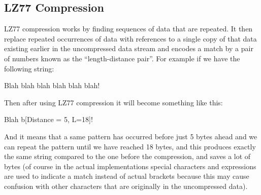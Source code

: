 \documentclass[12pt]{article}
\begin{document}
    \subsection{LZ77 Compression}
    LZ77 compression works by finding sequences of data that are repeated. It then replace repeated occurrences of data with references to a single copy of that data existing earlier in the uncompressed data stream and encodes a match by a pair of numbers known as the ``length-distance pair''. For example if we have the following string:\\
    \begin{center} Blah blah blah blah blah blah! \end{center}
    Then after using LZ77 compression it will become something like this:\\
    \begin{center} Blah b[Distance = 5, L=18]! \end{center}
    And it means that a same pattern has occurred before just 5 bytes ahead and we can repeat the pattern until we have reached 18 bytes, and this produces exactly the same string compared to the one before the compression, and saves a lot of bytes (of course in the actual implementations special characters and expressions are used to indicate a match instead of actual brackets because this may cause confusion with other characters that are originally in the uncompressed data).
\end{document}
